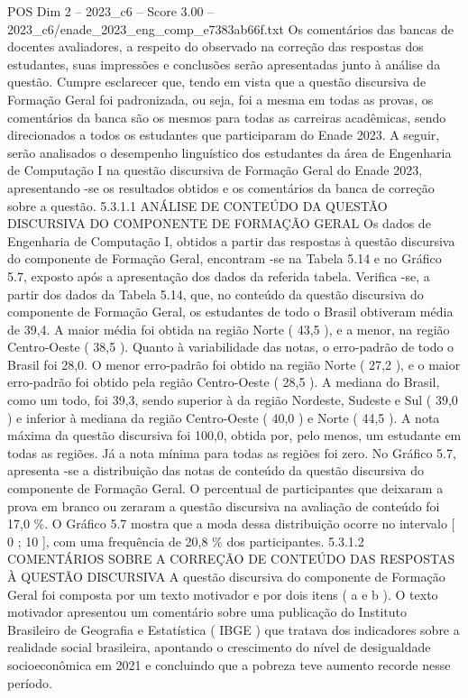 \begin{textsample}{POS Dim 2 – 2023\_c6 – Score 3.00 – 2023\_c6/enade\_2023\_eng\_comp\_e7383ab66f.txt}
Os comentários das bancas de docentes avaliadores, a respeito do observado na correção das respostas dos estudantes, suas impressões e conclusões serão apresentadas junto à análise da questão.
Cumpre esclarecer que, tendo em vista que a questão discursiva de Formação Geral foi padronizada, ou seja, foi a mesma em todas as provas, os comentários da banca são os mesmos para todas as carreiras acadêmicas, sendo direcionados a todos os estudantes que participaram do Enade 2023.
A seguir, serão analisados o desempenho linguístico dos estudantes da área de Engenharia de Computação I na questão discursiva de Formação Geral do Enade 2023, apresentando -se os resultados obtidos e os comentários da banca de correção sobre a questão. 5.3.1.1 ANÁLISE DE CONTEÚDO DA QUESTÃO DISCURSIVA DO COMPONENTE DE FORMAÇÃO GERAL Os dados de Engenharia de Computação I, obtidos a partir das respostas à questão discursiva do componente de Formação Geral, encontram -se na Tabela 5.14 e no Gráfico 5.7, exposto após a apresentação dos dados da referida tabela.
Verifica -se, a partir dos dados da Tabela 5.14, que, no conteúdo da questão discursiva do componente de Formação Geral, os estudantes de todo o Brasil obtiveram média de 39,4.
A maior média foi obtida na região Norte ( 43,5 ), e a menor, na região Centro-Oeste ( 38,5 ).
Quanto à variabilidade das notas, o erro-padrão de todo o Brasil foi 28,0.
O menor erro-padrão foi obtido na região Norte ( 27,2 ), e o maior erro-padrão foi obtido pela região Centro-Oeste ( 28,5 ).
A mediana do Brasil, como um todo, foi 39,3, sendo superior à da região Nordeste, Sudeste e Sul ( 39,0 ) e inferior à mediana da região Centro-Oeste ( 40,0 ) e Norte ( 44,5 ).
A nota máxima da questão discursiva foi 100,0, obtida por, pelo menos, um estudante em todas as regiões.
Já a nota mínima para todas as regiões foi zero.
No Gráfico 5.7, apresenta -se a distribuição das notas de conteúdo da questão discursiva do componente de Formação Geral.
O percentual de participantes que deixaram a prova em branco ou zeraram a questão discursiva na avaliação de conteúdo foi 17,0 \%.
O Gráfico 5.7 mostra que a moda dessa distribuição ocorre no intervalo [ 0 ; 10 ], com uma frequência de 20,8 \% dos participantes. 5.3.1.2 COMENTÁRIOS SOBRE A CORREÇÃO DE CONTEÚDO DAS RESPOSTAS À QUESTÃO DISCURSIVA A questão discursiva do componente de Formação Geral foi composta por um texto motivador e por dois itens ( a e b ).
O texto motivador apresentou um comentário sobre uma publicação do Instituto Brasileiro de Geografia e Estatística ( IBGE ) que tratava dos indicadores sobre a realidade social brasileira, apontando o crescimento do nível de desigualdade socioeconômica em 2021 e concluindo que a pobreza teve aumento recorde nesse período.

\end{textsample}
